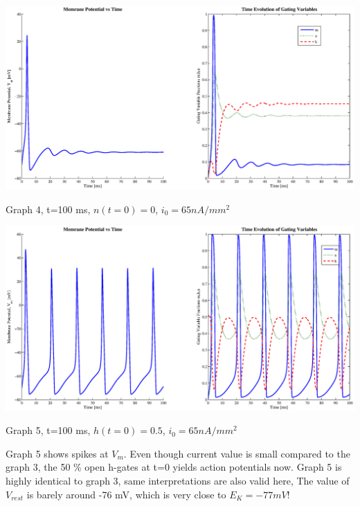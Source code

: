 \documentclass{article}
\begin{document}
\begin{center}
 \includegraphics[width=\textwidth]{discus3.eps}
\begin{footnotesize}Graph 4, t=100 ms, $n(t=0)=0$, $i_{0}=65 nA/mm^2$  \end{footnotesize}
\end{center}

\begin{center}
 \includegraphics[width=\textwidth]{discus4.eps}
\begin{footnotesize}Graph 5, t=100 ms, $h(t=0)=0.5$, $i_{0}=65 nA/mm^2$  \end{footnotesize}
\end{center}

Graph 5 shows spikes at $V_{m}$. Even though current value is small compared to the graph 3, the 50 \% open h-gates at t=0 yields action potentials now. Graph 5 is highly identical to graph 3, same interpretations are also valid here, The value of $V_{rest}$ is barely around -76 mV, which is very close to $E_{K}=-77 mV$! \\ 
\end{document}
